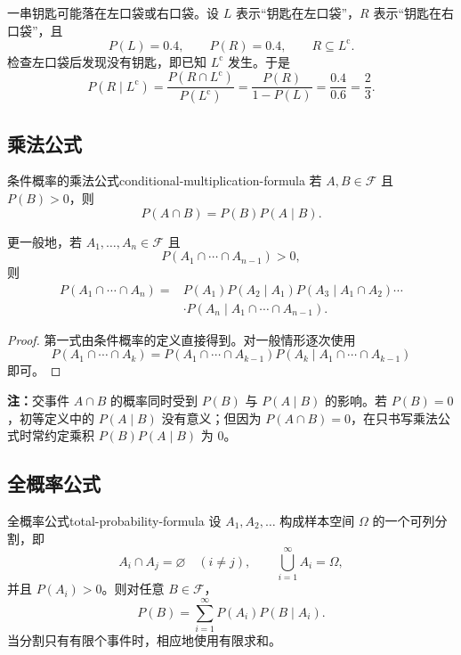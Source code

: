 \begin{example}[寻找钥匙]
一串钥匙可能落在左口袋或右口袋。设 $L$ 表示“钥匙在左口袋”，$R$ 表示“钥匙在右口袋”，且
\[
P(L)=0.4,\qquad P(R)=0.4,\qquad R\subseteq L^{\mathrm c}.
\]
检查左口袋后发现没有钥匙，即已知 $L^{\mathrm c}$ 发生。于是
\[
P(R\mid L^{\mathrm c})
=\frac{P(R\cap L^{\mathrm c})}{P(L^{\mathrm c})}
=\frac{P(R)}{1-P(L)}
=\frac{0.4}{0.6}
=\frac23.
\]
\end{example}

\subsection*{乘法公式}

\begin{mytheorem}{条件概率的乘法公式}{conditional-multiplication-formula}
若 $A,B\in\mathscr{F}$ 且 $P(B)>0$，则
\[
P(A\cap B)=P(B)P(A\mid B).
\]

更一般地，若 $A_1,\ldots,A_n\in\mathscr{F}$ 且
\[
P(A_1\cap\cdots\cap A_{n-1})>0,
\]
则
\[
\begin{aligned}
P(A_1\cap\cdots\cap A_n)
={}&P(A_1)P(A_2\mid A_1)P(A_3\mid A_1\cap A_2)\cdots\\
&\cdot P(A_n\mid A_1\cap\cdots\cap A_{n-1}).
\end{aligned}
\]
\end{mytheorem}

\begin{proof}
第一式由条件概率的定义直接得到。对一般情形逐次使用
\[
P(A_1\cap\cdots\cap A_k)
=P(A_1\cap\cdots\cap A_{k-1})
P(A_k\mid A_1\cap\cdots\cap A_{k-1})
\]
即可。
\end{proof}

\textbf{注：}\quad 交事件 $A\cap B$ 的概率同时受到 $P(B)$ 与 $P(A\mid B)$ 的影响。若 $P(B)=0$，初等定义中的 $P(A\mid B)$ 没有意义；但因为 $P(A\cap B)=0$，在只书写乘法公式时常约定乘积 $P(B)P(A\mid B)$ 为 $0$。

\subsection*{全概率公式}

\begin{mytheorem}{全概率公式}{total-probability-formula}
设 $A_1,A_2,\ldots$ 构成样本空间 $\Omega$ 的一个可列分割，即
\[
A_i\cap A_j=\varnothing\quad(i\ne j),
\qquad
\bigcup_{i=1}^{\infty}A_i=\Omega,
\]
并且 $P(A_i)>0$。则对任意 $B\in\mathscr{F}$，
\[
P(B)=\sum_{i=1}^{\infty}P(A_i)P(B\mid A_i).
\]
当分割只有有限个事件时，相应地使用有限求和。
\end{mytheorem}

